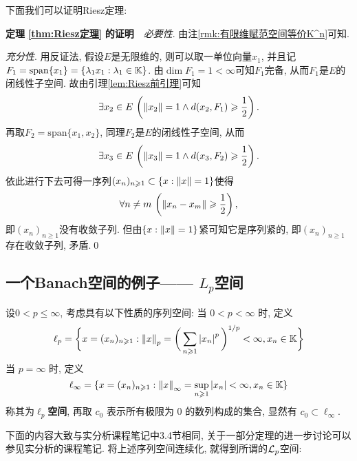 	下面我们可以证明Riesz定理:
	
	\textbf{定理\,\,\ref{thm:Riesz定理}\,\,的证明}\ \ \textsl{必要性}. 由注\ref{rmk:有限维赋范空间等价K^n}可知.
	
	\textsl{充分性}. 用反证法, 假设$ E $是无限维的, 则可以取一单位向量$ x_1 $, 并且记$ F_1=\mathrm{span}\{x_1\}=\{ \lambda_1x_1 : \lambda_1\in\mathbb{K} \} $. 由$ \dim F_1=1<\infty $可知$ F_1 $完备, 从而$ F_1 $是$ E $的闭线性子空间. 故由引理\ref{lem:Riesz前引理}可知
	\[
	\exists x_2\in E\,\left(\left\| x_2 \right\|=1\land d(x_2,F_1)\geqslant\frac{1}{2}\right).
	\]
	再取$ F_2=\mathrm{span}\{x_1,x_2\} $, 同理$ F_2 $是$ E $的闭线性子空间, 从而
	\[
	\exists x_3\in E\,\left(\left\| x_3 \right\|=1\land d(x_3,F_2)\geqslant\frac{1}{2}\right).
	\]
	依此进行下去可得一序列$ (x_n)_{n\geqslant 1}\subset\{ x : \left\| x \right\|=1 \} $使得
	\[
	\forall n\ne m\,\left(\left\| x_n-x_m \right\|\geqslant\frac{1}{2}\right),
	\]
	即$ (x_n)_{n\geqslant 1} $没有收敛子列. 但由$ \{ x : \left\| x \right\|=1 \} $紧可知它是序列紧的, 即$ (x_n)_{n\geqslant 1} $存在收敛子列, 矛盾.\qed
	
    \subsection{一个Banach空间的例子—— $ L_p $空间}
     
     \begin{Definition}[$ \ell_{p} $空间]\label{def:lp空间}
		设$ 0<p\leqslant\infty $, 考虑具有以下性质的序列空间:
          当 $ 0<p<\infty $ 时, 定义
          \[
               \ell_{p}=\bigg\{ x=(x_{n})_{n\geqslant1}: \left\| x \right\|_{p}=\bigg( \sum\limits_{n\geqslant1}\left| x_{n} \right| ^{p} \bigg)^{1/p}<\infty, x_{n}\in\mathbb{K} \bigg\}
          \]
           当 $ p=\infty $ 时, 定义
           \[
                \ell_{\infty}=\{ x=(x_{n})_{n\geqslant1}:\left\| x \right\|_{\infty}=\sup_{n\geqslant1}\left| x_{n} \right| <\infty, x_{n}\in\mathbb{K} \}
           \]
           称其为\textbf{$ \ell_{p} $空间}, 再取 $ c_{0} $ 表示所有极限为 $ 0 $ 的数列构成的集合, 显然有 $ c_{0}\subset\ell_{\infty} $. 
     \end{Definition}
	
	下面的内容大致与实分析课程笔记中3.4节相同, 关于一部分定理的进一步讨论可以参见实分析的课程笔记. 将上述序列空间连续化, 就得到所谓的$ \mathcal{L}_p $空间:
	
